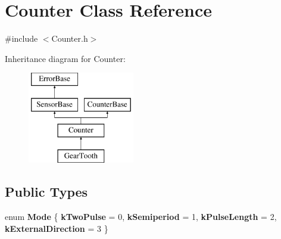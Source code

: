\hypertarget{classCounter}{
\section{Counter Class Reference}
\label{classCounter}
}


{\ttfamily \#include $<$Counter.h$>$}

Inheritance diagram for Counter:\begin{figure}[H]
\begin{center}
\leavevmode
\includegraphics[height=4.000000cm]{classCounter}
\end{center}
\end{figure}
\subsection*{Public Types}
\begin{DoxyCompactItemize}
\item 
enum {\bfseries Mode} \{ {\bfseries kTwoPulse} = 0, 
{\bfseries kSemiperiod} = 1, 
{\bfseries kPulseLength} = 2, 
{\bfseries kExternalDirection} = 3
 \}
\end{DoxyCompactItemize}
